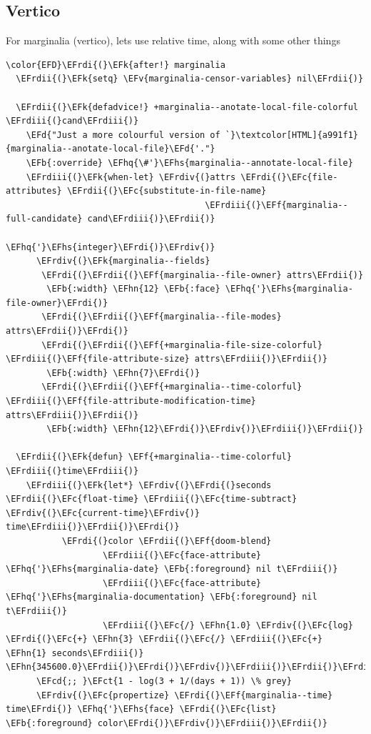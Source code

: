 \documentclass{scrartcl}
\newcommand{\EFk}[1]{\textcolor{EFk}{#1}} %
\newcommand{\EFd}[1]{\textcolor{EFd}{#1}} %
\newcommand{\EFb}[1]{\textcolor{EFb}{#1}} %
\newcommand{\EFct}[1]{\textcolor{EFct}{#1}} %
\newcommand{\EFc}[1]{\textcolor{EFc}{#1}} %
\newcommand{\EFv}[1]{\textcolor{EFv}{#1}} %
\newcommand{\EFf}[1]{\textcolor{EFf}{#1}} %
\newcommand{\EFcd}[1]{\textcolor{EFcd}{#1}} %
\newcommand{\EFhn}[1]{#1} %
\newcommand{\EFhq}[1]{#1} %
\newcommand{\EFhs}[1]{#1} %
\newcommand{\EFrdi}[1]{#1} %
\newcommand{\EFrdii}[1]{#1} %
\newcommand{\EFrdiii}[1]{#1} %
\newcommand{\EFrdiv}[1]{#1} %
\begin{document}
\subsection{Vertico}
\label{sec:org3e9089f}
For marginalia (vertico), lets use relative time, along with some other things
\begin{Code}
\begin{Verbatim}[]
\color{EFD}\EFrdi{(}\EFk{after!} marginalia
  \EFrdii{(}\EFk{setq} \EFv{marginalia-censor-variables} nil\EFrdii{)}

  \EFrdii{(}\EFk{defadvice!} +marginalia--anotate-local-file-colorful \EFrdiii{(}cand\EFrdiii{)}
    \EFd{"Just a more colourful version of `}\textcolor[HTML]{a991f1}{marginalia--anotate-local-file}\EFd{'."}
    \EFb{:override} \EFhq{\#'}\EFhs{marginalia--annotate-local-file}
    \EFrdiii{(}\EFk{when-let} \EFrdiv{(}attrs \EFrdi{(}\EFc{file-attributes} \EFrdii{(}\EFc{substitute-in-file-name}
                                       \EFrdiii{(}\EFf{marginalia--full-candidate} cand\EFrdiii{)}\EFrdii{)}
                                      \EFhq{'}\EFhs{integer}\EFrdi{)}\EFrdiv{)}
      \EFrdiv{(}\EFk{marginalia--fields}
       \EFrdi{(}\EFrdii{(}\EFf{marginalia--file-owner} attrs\EFrdii{)}
        \EFb{:width} \EFhn{12} \EFb{:face} \EFhq{'}\EFhs{marginalia-file-owner}\EFrdi{)}
       \EFrdi{(}\EFrdii{(}\EFf{marginalia--file-modes} attrs\EFrdii{)}\EFrdi{)}
       \EFrdi{(}\EFrdii{(}\EFf{+marginalia-file-size-colorful} \EFrdiii{(}\EFf{file-attribute-size} attrs\EFrdiii{)}\EFrdii{)}
        \EFb{:width} \EFhn{7}\EFrdi{)}
       \EFrdi{(}\EFrdii{(}\EFf{+marginalia--time-colorful} \EFrdiii{(}\EFf{file-attribute-modification-time} attrs\EFrdiii{)}\EFrdii{)}
        \EFb{:width} \EFhn{12}\EFrdi{)}\EFrdiv{)}\EFrdiii{)}\EFrdii{)}

  \EFrdii{(}\EFk{defun} \EFf{+marginalia--time-colorful} \EFrdiii{(}time\EFrdiii{)}
    \EFrdiii{(}\EFk{let*} \EFrdiv{(}\EFrdi{(}seconds \EFrdii{(}\EFc{float-time} \EFrdiii{(}\EFc{time-subtract} \EFrdiv{(}\EFc{current-time}\EFrdiv{)} time\EFrdiii{)}\EFrdii{)}\EFrdi{)}
           \EFrdi{(}color \EFrdii{(}\EFf{doom-blend}
                   \EFrdiii{(}\EFc{face-attribute} \EFhq{'}\EFhs{marginalia-date} \EFb{:foreground} nil t\EFrdiii{)}
                   \EFrdiii{(}\EFc{face-attribute} \EFhq{'}\EFhs{marginalia-documentation} \EFb{:foreground} nil t\EFrdiii{)}
                   \EFrdiii{(}\EFc{/} \EFhn{1.0} \EFrdiv{(}\EFc{log} \EFrdi{(}\EFc{+} \EFhn{3} \EFrdii{(}\EFc{/} \EFrdiii{(}\EFc{+} \EFhn{1} seconds\EFrdiii{)} \EFhn{345600.0}\EFrdii{)}\EFrdi{)}\EFrdiv{)}\EFrdiii{)}\EFrdii{)}\EFrdi{)}\EFrdiv{)}
      \EFcd{;; }\EFct{1 - log(3 + 1/(days + 1)) \% grey}
      \EFrdiv{(}\EFc{propertize} \EFrdi{(}\EFf{marginalia--time} time\EFrdi{)} \EFhq{'}\EFhs{face} \EFrdi{(}\EFc{list} \EFb{:foreground} color\EFrdi{)}\EFrdiv{)}\EFrdiii{)}\EFrdii{)}


\end{Verbatim}
\end{Code}
\end{document}
